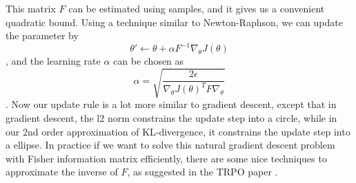 This matrix $F$ can be estimated using samples, and it gives us a convenient quadratic bound. Using a technique similar to Newton-Raphson, we can update the parameter by 
\[\theta' \leftarrow \theta  + \alpha F^{-1}\nabla_\theta J(\theta)\]
, and the learning rate $\alpha$ can be chosen as 
\[
\alpha = \sqrt{\frac{2\epsilon}{\nabla_\theta J(\theta)^TF\nabla_\theta}}
\]. Now our update rule is a lot more similar to gradient descent, except that in gradient descent, the l2 norm constrains the update step into a circle, while in our 2nd order approximation of KL-divergence, it constrains the update step into a ellipse. In practice if we want to solve this natural gradient descent problem with Fisher information matrix efficiently, there are some nice techniques to approximate the inverse of $F$, as suggested in the TRPO paper \cite{schulman2015trust}.
